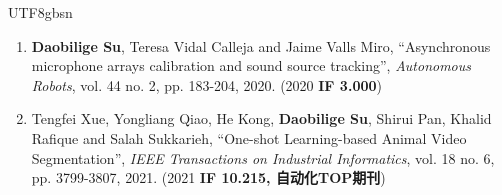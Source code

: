 \documentclass[margin,line]{res}
\begin{document}
\begin{CJK*}{UTF8}{gbsn}
\begin{resume}
\begin{enumerate}
\item {\bf Daobilige Su}, Teresa Vidal Calleja and Jaime Valls Miro, ``Asynchronous microphone arrays calibration and sound source tracking'', {\it Autonomous Robots}, vol. 44 no. 2, pp. 183-204, 2020. (2020 \textbf{IF 3.000})

\item Tengfei Xue, Yongliang Qiao, He Kong, \textbf{Daobilige Su}, Shirui Pan, Khalid Rafique and Salah Sukkarieh, ``One-shot Learning-based Animal Video Segmentation'', {\it IEEE Transactions on Industrial Informatics}, vol. 18 no. 6, pp. 3799-3807, 2021. (2021 \textbf{IF 10.215, 自动化TOP期刊})
\end{enumerate}







\end{resume}

\clearpage\end{CJK*}
\end{document}

